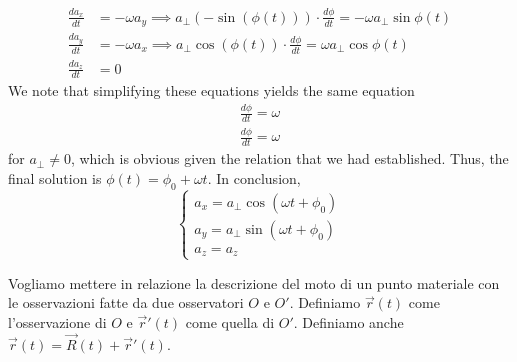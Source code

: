 \documentclass[a4paper]{article}
\begin{document}
{    \begin{align*}
        \frac{da_x}{dt} &= -\omega a_y \implies a_\perp (-\sin(\phi(t))) \cdot \frac{d\phi}{dt} = -\omega a_\perp \sin\phi(t) \\
        \frac{da_y}{dt} &= -\omega a_x \implies a_\perp \cos(\phi(t)) \cdot \frac{d\phi}{dt} = \omega a_\perp \cos\phi(t) \\
        \frac{da_z}{dt} &= 0
    \end{align*}
    We note that simplifying these equations yields the same equation 
    \begin{align*}
        \frac{d\phi}{dt} = \omega \\
        \frac{d\phi}{dt} = \omega
    \end{align*}
    for \(a_\perp \neq 0\),
    which is obvious given the relation that we had established.
    Thus, the final solution is \(\phi(t) = \phi_0 + \omega t\).
    In conclusion,
    \[
        \begin{cases}
            a_x = a_\perp \cos(\omega t + \phi_0) \\
            a_y = a_\perp \sin(\omega t + \phi_0) \\
            a_z = a_z
        \end{cases}
    \]
}

Vogliamo mettere in relazione la descrizione del moto di un punto materiale
con le osservazioni fatte da due osservatori \(O\) e \(O'\).
Definiamo \(\vec{r}(t)\) come l'osservazione di \(O\) e \(\vec{r}'(t)\) come quella di \(O'\).
Definiamo anche \(\vec{r}(t) = \vec{R}(t) + \vec{r}'(t)\).

\begin{center}
\end{center}
\end{document}
